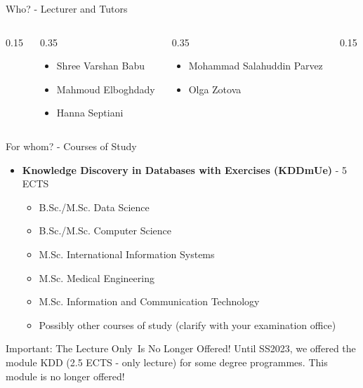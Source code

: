 \begin{frame}{Who? - Lecturer and Tutors}
{		\begin{columns}[T]
			\begin{column}{0.15\textwidth}
				\hfill
			\end{column}
			\begin{column}{0.35\textwidth}
				\begin{center}
					\begin{itemize}
						\item Shree Varshan Babu
						\item Mahmoud Elboghdady
						\item Hanna Septiani
					\end{itemize}
				\end{center}
			\end{column}
			\begin{column}{0.35\textwidth}
				\begin{center}
					\begin{itemize}
						\item Mohammad Salahuddin Parvez
						\item Olga Zotova
					\end{itemize}
				\end{center}
			\end{column}
			\begin{column}{0.15\textwidth}
				\hfill
			\end{column}
		\end{columns}
	}
\end{frame}

\begin{frame}{For whom? - Courses of Study}
	\begin{itemize}
		\item \textbf{Knowledge Discovery in Databases with Exercises (KDDmUe)} - 5 ECTS
		      \begin{itemize}
			      \item B.Sc./M.Sc. Data Science
			      \item B.Sc./M.Sc. Computer Science
			      \item M.Sc. International Information Systems
			      \item M.Sc. Medical Engineering
			      \item M.Sc. Information and Communication Technology
			      \item {\color{gray} Possibly other courses of study (clarify with your examination office)}
		      \end{itemize}
	\end{itemize}

	\vspace*{1cm}

	\begin{alertblock}{Important: The \glqq Lecture Only\grqq\ Is No Longer Offered!}
		Until SS2023, we offered the module KDD (2.5 ECTS - only lecture) for some degree programmes. This module is no longer offered!
	\end{alertblock}

\end{frame}

